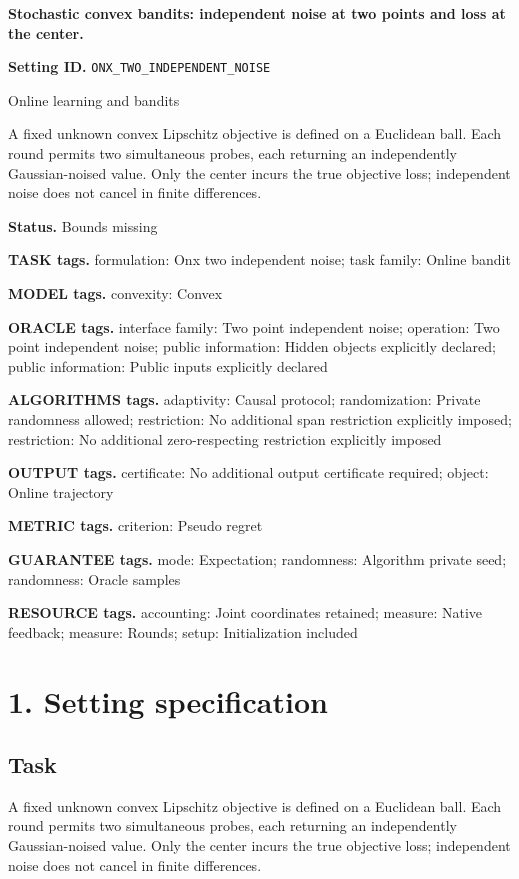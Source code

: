 \documentclass[10pt,a4paper]{article}
\begin{document}
\raggedright

{\LARGE\bfseries\sffamily\color{AtlasNavy} Stochastic convex bandits: independent noise at two points and loss at the center.\par}\vspace{5pt}
\textbf{Setting ID.} \texttt{ONX\_\allowbreak{}TWO\_\allowbreak{}INDEPENDENT\_\allowbreak{}NOISE}

Online learning and bandits

A fixed unknown convex Lipschitz objective is defined on a Euclidean ball. Each round permits two simultaneous probes, each returning an independently Gaussian-noised value. Only the center incurs the true objective loss; independent noise does not cancel in finite differences.

\textbf{Status.} Bounds missing

\textbf{TASK tags.} formulation: Onx two independent noise; task family: Online bandit

\textbf{MODEL tags.} convexity: Convex

\textbf{ORACLE tags.} interface family: Two point independent noise; operation: Two point independent noise; public information: Hidden objects explicitly declared; public information: Public inputs explicitly declared

\textbf{ALGORITHMS tags.} adaptivity: Causal protocol; randomization: Private randomness allowed; restriction: No additional span restriction explicitly imposed; restriction: No additional zero-respecting restriction explicitly imposed

\textbf{OUTPUT tags.} certificate: No additional output certificate required; object: Online trajectory

\textbf{METRIC tags.} criterion: Pseudo regret

\textbf{GUARANTEE tags.} mode: Expectation; randomness: Algorithm private seed; randomness: Oracle samples

\textbf{RESOURCE tags.} accounting: Joint coordinates retained; measure: Native feedback; measure: Rounds; setup: Initialization included

\section{1. Setting specification}
\subsection{Task}
A fixed unknown convex Lipschitz objective is defined on a Euclidean ball. Each round permits two simultaneous probes, each returning an independently Gaussian-noised value. Only the center incurs the true objective loss; independent noise does not cancel in finite differences.
\end{document}
